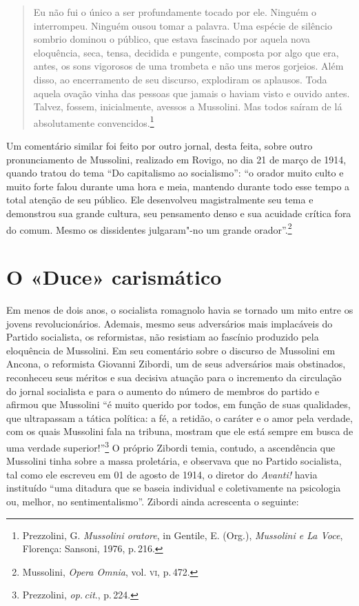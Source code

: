 \begin{quote}
Eu não fui o único a ser profundamente tocado por ele. Ninguém o
interrompeu. Ninguém ousou tomar a palavra. Uma espécie de silêncio
sombrio dominou o público, que estava fascinado por aquela nova
eloquência, seca, tensa, decidida e pungente, composta por algo que era,
antes, os sons vigorosos de uma trombeta e não uns meros gorjeios. Além
disso, ao encerramento de seu discurso, explodiram os aplausos. Toda
aquela ovação vinha das pessoas que jamais o haviam visto e ouvido
antes. Talvez, fossem, inicialmente, avessos a Mussolini. Mas todos
saíram de lá absolutamente convencidos.\footnote{Prezzolini, G.
  \emph{Mussolini oratore}, in Gentile, E. (Org.), \emph{Mussolini e La
  Voce}, Florença: Sansoni, 1976, p.\,216.}
\end{quote}

Um comentário similar foi feito por outro jornal, desta feita, sobre
outro pronunciamento de Mussolini, realizado em Rovigo, no dia 21 de
março de 1914, quando tratou do tema ``Do capitalismo ao socialismo'':
``o orador muito culto e muito forte falou durante uma hora e meia,
mantendo durante todo esse tempo a total atenção de seu público. Ele
desenvolveu magistralmente seu tema e demonstrou sua grande cultura, seu
pensamento denso e sua acuidade crítica fora do comum. Mesmo os
dissidentes julgaram"-no um grande orador''.\footnote{Mussolini,
  \emph{Opera Omnia}, vol. \textsc{vi}, p.\,472.}

\section{O «Duce» carismático}

Em menos de dois anos, o socialista romagnolo havia se tornado um mito
entre os jovens revolucionários. Ademais, mesmo seus adversários mais
implacáveis do Partido socialista, os reformistas, não resistiam ao
fascínio produzido pela eloquência de Mussolini. Em seu comentário sobre
o discurso de Mussolini em Ancona, o reformista Giovanni Zibordi, um de
seus adversários mais obstinados, reconheceu seus méritos e sua decisiva
atuação para o incremento da circulação do jornal socialista e para o
aumento do número de membros do partido e afirmou que Mussolini ``é
muito querido por todos, em função de suas qualidades, que ultrapassam a
tática política: a fé, a retidão, o caráter e o amor pela verdade, com
os quais Mussolini fala na tribuna, mostram que ele está sempre em busca
de uma verdade superior!''\footnote{Prezzolini, \emph{op.\,cit}., p.\,224.}
O próprio Zibordi temia, contudo, a ascendência que Mussolini tinha
sobre a massa proletária, e observava que no Partido socialista, tal
como ele escreveu em 01 de agosto de 1914, o diretor do \emph{Avanti!}
havia instituído ``uma ditadura que se baseia individual e coletivamente
na psicologia ou, melhor, no sentimentalismo''. Zibordi ainda acrescenta
o seguinte:

